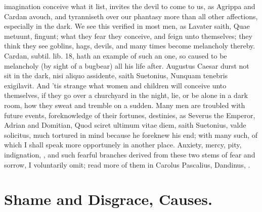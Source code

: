 {imagination conceive what it list, invites the devil to come to us, as
Agrippa and Cardan avouch, and tyranniseth over our phantasy more
than all other affections, especially in the dark. We see this verified
in most men, as Lavater saith, Quae metuunt, fingunt; what they
fear they conceive, and feign unto themselves; they think they see
goblins, hags, devils, and many times become melancholy thereby.
Cardan, subtil. lib. 18, hath an example of such an one, so caused to
be melancholy (by sight of a bugbear) all his life after. Augustus
Caesar durst not sit in the dark, nisi aliquo assidente, saith
Suetonius, Nunquam tenebris exigilavit. And 'tis strange what
women and children will conceive unto themselves, if they go over a
churchyard in the night, lie, or be alone in a dark room, how they
sweat and tremble on a sudden. Many men are troubled with future
events, foreknowledge of their fortunes, destinies, as Severus the
Emperor, Adrian and Domitian, Quod sciret ultimum vitae diem, saith
Suetonius, valde solicitus, much tortured in mind because he foreknew
his end; with many such, of which I shall speak more opportunely in
another place. Anxiety, mercy, pity, indignation, \etc{}, and such
fearful branches derived from these two stems of fear and sorrow, I
voluntarily omit; read more of them in Carolus Pascalius,
Dandinus, \etc{}.

\section{Shame and Disgrace, Causes.}

}
